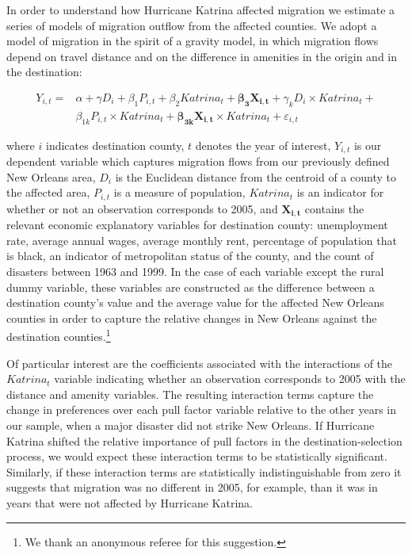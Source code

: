 \documentclass[]{article}
\begin{document}
In order to understand how Hurricane Katrina affected migration we
estimate a series of models of migration outflow from the affected
counties. We adopt a model of migration in the spirit of a gravity
model, in which migration flows depend on travel distance and on the
difference in amenities in the origin and in the destination:

\begin{equation} \label{eq:intreg}
\begin{split}
Y_{i,t} = &\alpha + \gamma {D}_{i} + \beta_1 {P}_{i,t} + \beta_2 {Katrina}_{t} + \mathbf{\beta_3} \mathbf{X_{i,t}} + \gamma_k {D}_{i} \times {Katrina}_{t} + \\
& \beta_{1k} {P}_{i,t} \times {Katrina}_{t} + \mathbf{\beta_{3k}} \mathbf{X_{i,t}} \times {Katrina}_{t} + \varepsilon_{i,t} 
\end{split}
\end{equation}

where \(i\) indicates destination county, \(t\) denotes the year of
interest, \(Y_{i,t}\) is our dependent variable which captures migration
flows from our previously defined New Orleans area, \({D}_{i}\) is the
Euclidean distance from the centroid of a county to the affected area,
\({P}_{i,t}\) is a measure of population, \({Katrina}_{t}\) is an
indicator for whether or not an observation corresponds to 2005, and
\(\mathbf{X_{i,t}}\) contains the relevant economic explanatory
variables for destination county: unemployment rate, average annual
wages, average monthly rent, percentage of population that is black, an
indicator of metropolitan status of the county, and the count of
disasters between 1963 and 1999. In the case of each variable except
the rural dummy variable, these variables are constructed
as the difference between a destination county's value and the average
value for the affected New Orleans counties in order to capture the
relative changes in New Orleans against the destination counties.\footnote{We thank an anonymous referee for this suggestion.}

Of particular interest are the coefficients associated with the
interactions of the \({Katrina}_{t}\) variable indicating whether an
observation corresponds to 2005 with the distance and amenity variables.
The resulting interaction terms capture the change in preferences over
each pull factor variable relative to the other years in our sample,
when a major disaster did not strike New Orleans. If Hurricane Katrina
shifted the relative importance of pull factors in the
destination-selection process, we would expect these interaction terms
to be statistically significant. Similarly, if these interaction terms
are statistically indistinguishable from zero it suggests that migration
was no different in 2005, for example, than it was in years that were
not affected by Hurricane Katrina.
\end{document}

